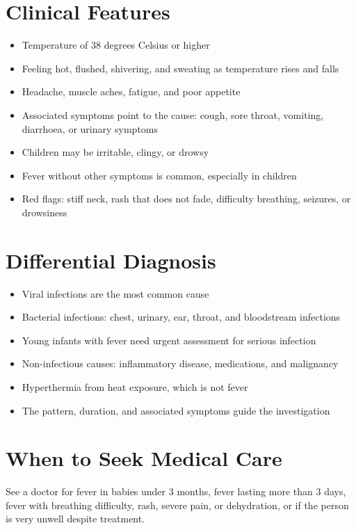 \section*{Clinical Features}
\begin{itemize}
    \item Temperature of 38 degrees Celsius or higher
    \item Feeling hot, flushed, shivering, and sweating as temperature rises and falls
    \item Headache, muscle aches, fatigue, and poor appetite
    \item Associated symptoms point to the cause: cough, sore throat, vomiting, diarrhoea, or urinary symptoms
    \item Children may be irritable, clingy, or drowsy
    \item Fever without other symptoms is common, especially in children
    \item Red flags: stiff neck, rash that does not fade, difficulty breathing, seizures, or drowsiness
\end{itemize}

\section*{Differential Diagnosis}
\begin{itemize}
    \item Viral infections are the most common cause
    \item Bacterial infections: chest, urinary, ear, throat, and bloodstream infections
    \item Young infants with fever need urgent assessment for serious infection
    \item Non-infectious causes: inflammatory disease, medications, and malignancy
    \item Hyperthermia from heat exposure, which is not fever
    \item The pattern, duration, and associated symptoms guide the investigation
\end{itemize}

\section*{When to Seek Medical Care}
See a doctor for fever in babies under 3 months, fever lasting more than 3 days, fever with breathing difficulty, rash, severe pain, or dehydration, or if the person is very unwell despite treatment.

